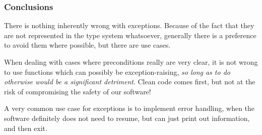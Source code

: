 \documentclass[aspectratio=169]{beamer}
\begin{document}
\begin{frame}[fragile]
  \frametitle{Conclusions}

  There is nothing inherently wrong with exceptions. Because of the fact that
  they are not represented in the type system whatsoever, generally there is a
  preference to avoid them where possible, but there are use cases.

  \pause
  \vspace{\fill}

  When dealing with cases where preconditions really are very clear, it is not
  wrong to use functions which can possibly be exception-raising, \textit{so
  long as to do otherwise would be a significant detriment}. Clean code comes
  first, but not at the risk of compromising the safety of our software!

  \pause
  \vspace{\fill}

  A very common use case for exceptions is to implement error handling, when
  the software definitely does not need to resume, but can just print out
  information, and then exit.
\end{frame}




\thankyou

\end{document}
